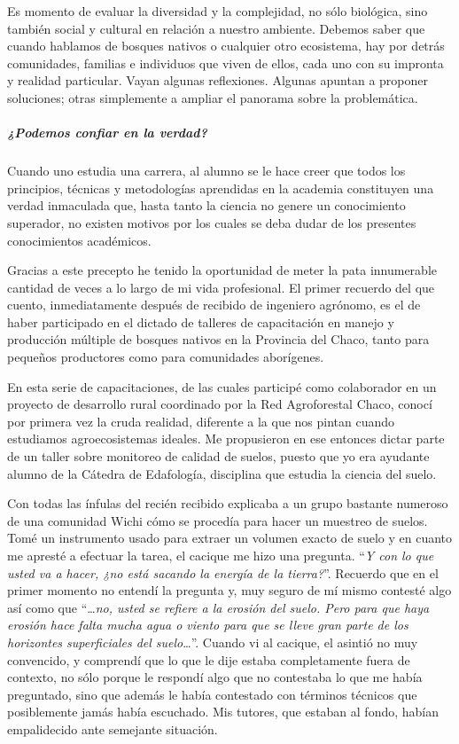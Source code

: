 \documentclass[
]{article}
\begin{document}
Es momento de evaluar la diversidad y la complejidad, no sólo biológica,
sino también social y cultural en relación a nuestro ambiente. Debemos
saber que cuando hablamos de bosques nativos o cualquier otro
ecosistema, hay por detrás comunidades, familias e individuos que viven
de ellos, cada uno con su impronta y realidad particular. Vayan algunas
reflexiones. Algunas apuntan a proponer soluciones; otras simplemente a
ampliar el panorama sobre la problemática.

\hypertarget{podemos-confiar-en-la-verdad}{%
\subparagraph{¿Podemos confiar en la
verdad?}\label{podemos-confiar-en-la-verdad}}

Cuando uno estudia una carrera, al alumno se le hace creer que todos los
principios, técnicas y metodologías aprendidas en la academia
constituyen una verdad inmaculada que, hasta tanto la ciencia no genere
un conocimiento superador, no existen motivos por los cuales se deba
dudar de los presentes conocimientos académicos.

Gracias a este precepto he tenido la oportunidad de meter la pata
innumerable cantidad de veces a lo largo de mi vida profesional. El
primer recuerdo del que cuento, inmediatamente después de recibido de
ingeniero agrónomo, es el de haber participado en el dictado de talleres
de capacitación en manejo y producción múltiple de bosques nativos en la
Provincia del Chaco, tanto para pequeños productores como para
comunidades aborígenes.

En esta serie de capacitaciones, de las cuales participé como
colaborador en un proyecto de desarrollo rural coordinado por la Red
Agroforestal Chaco, conocí por primera vez la cruda realidad, diferente
a la que nos pintan cuando estudiamos agroecosistemas ideales. Me
propusieron en ese entonces dictar parte de un taller sobre monitoreo de
calidad de suelos, puesto que yo era ayudante alumno de la Cátedra de
Edafología, disciplina que estudia la ciencia del suelo.

Con todas las ínfulas del recién recibido explicaba a un grupo bastante
numeroso de una comunidad Wichi cómo se procedía para hacer un muestreo
de suelos. Tomé un instrumento usado para extraer un volumen exacto de
suelo y en cuanto me apresté a efectuar la tarea, el cacique me hizo una
pregunta. ``\emph{Y con lo que usted va a hacer, ¿no está sacando la
energía de la tierra?}''. Recuerdo que en el primer momento no entendí
la pregunta y, muy seguro de mí mismo contesté algo así como que
``\ldots{}\emph{no, usted se refiere a la erosión del suelo. Pero para
que haya erosión hace falta mucha agua o viento para que se lleve gran
parte de los horizontes superficiales del suelo}\ldots{}''. Cuando vi al
cacique, el asintió no muy convencido, y comprendí que lo que le dije
estaba completamente fuera de contexto, no sólo porque le respondí algo
que no contestaba lo que me había preguntado, sino que además le había
contestado con términos técnicos que posiblemente jamás había escuchado.
Mis tutores, que estaban al fondo, habían empalidecido ante semejante
situación.
\end{document}
